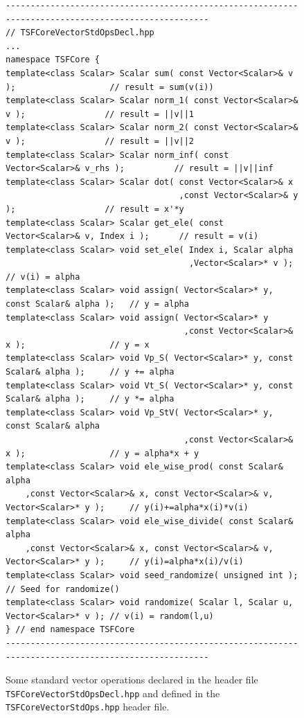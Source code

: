 {\bsinglespace
\begin{figure}[t]
\begin{minipage}{\textwidth}
{\scriptsize\begin{verbatim}
----------------------------------------------------------------------------------------------------
// TSFCoreVectorStdOpsDecl.hpp
...
namespace TSFCore {
template<class Scalar> Scalar sum( const Vector<Scalar>& v );                   // result = sum(v(i))
template<class Scalar> Scalar norm_1( const Vector<Scalar>& v );                // result = ||v||1
template<class Scalar> Scalar norm_2( const Vector<Scalar>& v );                // result = ||v||2
template<class Scalar> Scalar norm_inf( const Vector<Scalar>& v_rhs );          // result = ||v||inf
template<class Scalar> Scalar dot( const Vector<Scalar>& x
                                   ,const Vector<Scalar>& y );                  // result = x'*y
template<class Scalar> Scalar get_ele( const Vector<Scalar>& v, Index i );      // result = v(i)
template<class Scalar> void set_ele( Index i, Scalar alpha
                                     ,Vector<Scalar>* v );                      // v(i) = alpha
template<class Scalar> void assign( Vector<Scalar>* y, const Scalar& alpha );   // y = alpha
template<class Scalar> void assign( Vector<Scalar>* y
                                    ,const Vector<Scalar>& x );                 // y = x
template<class Scalar> void Vp_S( Vector<Scalar>* y, const Scalar& alpha );     // y += alpha
template<class Scalar> void Vt_S( Vector<Scalar>* y, const Scalar& alpha );     // y *= alpha
template<class Scalar> void Vp_StV( Vector<Scalar>* y, const Scalar& alpha
                                    ,const Vector<Scalar>& x );                 // y = alpha*x + y
template<class Scalar> void ele_wise_prod( const Scalar& alpha
    ,const Vector<Scalar>& x, const Vector<Scalar>& v, Vector<Scalar>* y );     // y(i)+=alpha*x(i)*v(i)
template<class Scalar> void ele_wise_divide( const Scalar& alpha
    ,const Vector<Scalar>& x, const Vector<Scalar>& v, Vector<Scalar>* y );     // y(i)=alpha*x(i)/v(i)
template<class Scalar> void seed_randomize( unsigned int );                     // Seed for randomize()
template<class Scalar> void randomize( Scalar l, Scalar u, Vector<Scalar>* v ); // v(i) = random(l,u)
} // end namespace TSFCore
----------------------------------------------------------------------------------------------------
\end{verbatim}}
\end{minipage}
\caption{
\label{tsfcore:fig:std_vec_ops}
Some standard vector operations declared in the header file \texttt{TSFCore\-Vector\-Std\-Ops\-Decl.hpp}
and defined in the \texttt{TSFCore\-Vector\-Std\-Ops.hpp} header file.
}
\end{figure}
\esinglespace}

